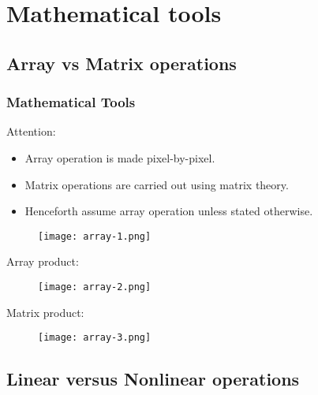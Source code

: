 
\section{Mathematical tools}


\subsection{Array vs Matrix operations}


\begin{frame}
\frametitle{Mathematical Tools}
Attention:
\begin{itemize}
\item Array operation is made pixel-by-pixel.
\item Matrix operations are carried out using matrix theory.
\item Henceforth assume array operation unless stated otherwise.
\end{itemize}
\begin{figure}
\centering
\texttt{[image: array-1.png]}
\end{figure}
\end{frame}


\begin{frame}
Array product:
\begin{figure}
\centering
\texttt{[image: array-2.png]}
\end{figure}
Matrix product:
\begin{figure}
\centering
\texttt{[image: array-3.png]}
\end{figure}
\end{frame}


\subsection{Linear versus Nonlinear operations}

